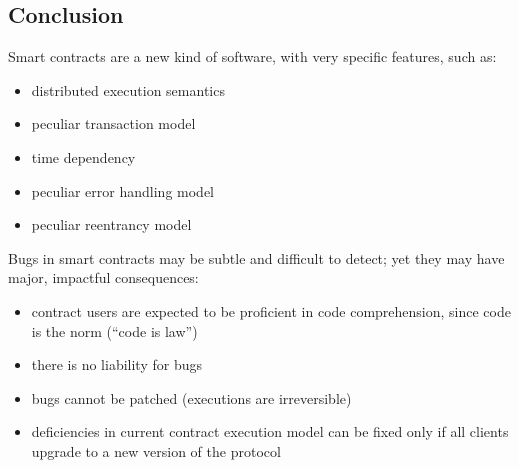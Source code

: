 \documentclass[a4paper, 10pt, titlepage]{article}
\begin{document}
\subsection{Conclusion}
Smart contracts are a new kind of software, with very specific features, such as:
\begin{itemize}
\item distributed execution semantics
\item peculiar transaction model
\item time dependency
\item peculiar error handling model
\item peculiar reentrancy model
\end{itemize}
Bugs in smart contracts may be subtle and difficult to detect; yet they may have major, impactful consequences:
\begin{itemize}
\item contract users are expected to be proficient in code comprehension, since code is the norm (“code is law”)
\item there is no liability for bugs
\item bugs cannot be patched (executions are irreversible)
\item deficiencies in current contract execution model can be fixed only if all clients upgrade to a new version of the protocol
\end{itemize}

 
\end{document}
